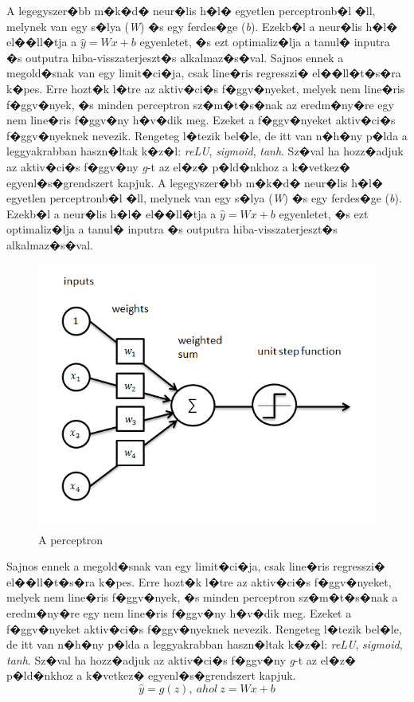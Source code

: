 \documentclass[12pt]{report}
\theoremstyle{definition}
\begin{document}
A legegyszer�bb m�k�d� neur�lis h�l� egyetlen perceptronb�l �ll, melynek van 
egy s�lya (\textit{W}) �s egy ferdes�ge (\textit{b}). Ezekb�l a neur�lis h�l� 
el��ll�tja a $ \hat{y}=Wx + b $ egyenletet, �s ezt optimaliz�lja a tanul� 
inputra �s outputra hiba-visszaterjeszt�s alkalmaz�s�val. Sajnos ennek a 
megold�snak van egy limit�ci�ja, csak line�ris regresszi� el��ll�t�s�ra k�pes. 
Erre hozt�k l�tre az aktiv�ci�s f�ggv�nyeket, melyek nem line�ris f�ggv�nyek, 
�s minden perceptron sz�m�t�s�nak az eredm�ny�re egy nem line�ris f�ggv�ny 
h�v�dik meg. Ezeket a f�ggv�nyeket aktiv�ci�s f�ggv�nyeknek nevezik. Rengeteg 
l�tezik bel�le, de itt van n�h�ny p�lda a leggyakrabban haszn�ltak k�z�l: 
\textit{reLU}, \textit{sigmoid}, \textit{tanh}. Sz�val ha hozz�adjuk az 
aktiv�ci�s f�ggv�ny \textit{g}-t az el�z� p�ld�nkhoz a k�vetkez� 
egyenl�s�grendszert kapjuk.
A legegyszer�bb m�k�d� neur�lis h�l� egyetlen perceptronb�l �ll, melynek van egy s�lya (\textit{W}) �s egy ferdes�ge (\textit{b}). Ezekb�l a neur�lis h�l� el��ll�tja a $ \hat{y}=Wx + b $ egyenletet, �s ezt optimaliz�lja a tanul� inputra �s outputra hiba-visszaterjeszt�s alkalmaz�s�val. 
	\begin{figure}
		\centering
		\includegraphics[scale=0.6]{perceptron.png}
		\caption{A perceptron}
	\end{figure}

Sajnos ennek a megold�snak van egy limit�ci�ja, csak line�ris regresszi� el��ll�t�s�ra k�pes. Erre hozt�k l�tre az aktiv�ci�s f�ggv�nyeket, melyek nem line�ris f�ggv�nyek, �s minden perceptron sz�m�t�s�nak a eredm�ny�re egy nem line�ris f�ggv�ny h�v�dik meg. Ezeket a f�ggv�nyeket aktiv�ci�s f�ggv�nyeknek nevezik. Rengeteg l�tezik bel�le, de itt van n�h�ny p�lda a leggyakrabban haszn�ltak k�z�l: \textit{reLU}, \textit{sigmoid}, \textit{tanh}. Sz�val ha hozz�adjuk az aktiv�ci�s f�ggv�ny \textit{g}-t az el�z� p�ld�nkhoz a k�vetkez� egyenl�s�grendszert kapjuk.
\begin{displaymath}
\hat{y}= g(z),\ ahol\ z = Wx + b
\end{displaymath}
\end{document}
